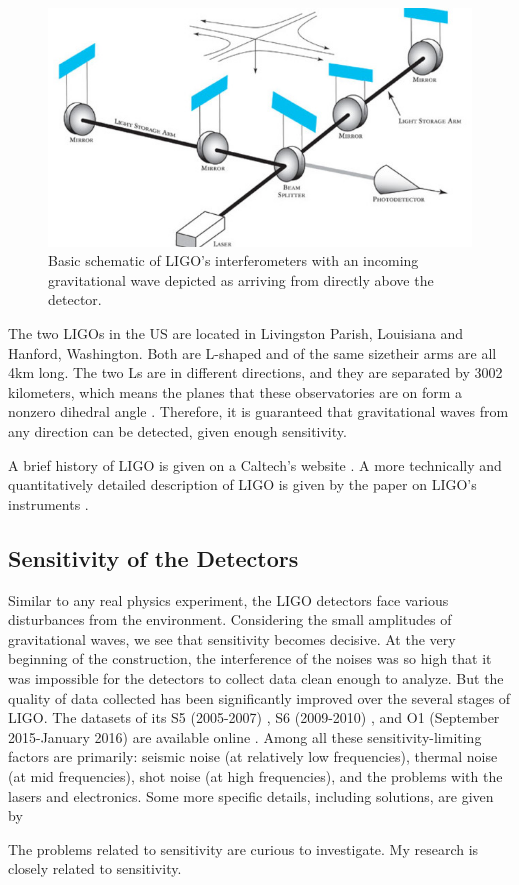\documentclass[aps,prd,preprint]{revtex4}
\begin{document}
\begin{figure}
	\includegraphics[scale = 0.7]{basic_ifo_diagram}
	\caption{Basic schematic of LIGO's interferometers with an incoming gravitational wave depicted as arriving from directly above the detector. \cite{CaltechLIGO}}
\end{figure}
\par The two LIGOs in the US are located in Livingston Parish, Louisiana and Hanford, Washington. Both are L-shaped and of the same size\textemdash their arms are all 4km long. The two Ls are in different directions, and they are separated by 3002 kilometers, which means the planes that these observatories are on form a nonzero dihedral angle \cite{DualDetector}. Therefore, it is guaranteed that gravitational waves from any direction can be detected, given enough sensitivity.
\par A brief history of LIGO is given on a Caltech's website \cite{BHLIGO}. A more technically and quantitatively detailed description of LIGO is given by the paper on LIGO's instruments \cite{instrument}.

\subsection{Sensitivity of the Detectors}
Similar to any real physics experiment, the LIGO detectors face various disturbances from the environment. Considering the small amplitudes of gravitational waves, we see that sensitivity becomes decisive. At the very beginning of the construction, the interference of the noises was so high that it was impossible for the detectors to collect data clean enough to analyze. But the quality of data collected has been significantly improved over the several stages of LIGO. The datasets of its S5 (2005-2007) \cite{S5}, S6 (2009-2010) \cite{S6}, and O1 (September 2015-January 2016) \cite{Observation1} are available online \cite{TLdata}. Among all these sensitivity-limiting factors are primarily: seismic noise (at relatively low frequencies), thermal noise (at mid frequencies), shot noise (at high frequencies), and the problems with the lasers and electronics. Some more specific details, including solutions, are given by \cite{Noise, thermal, seismic}
\par The problems related to sensitivity are curious to investigate. My research is closely related to sensitivity.
\end{document}
